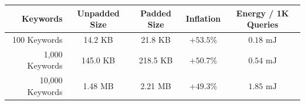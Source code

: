 \documentclass[preview,varwidth=90mm]{standalone}
\begin{document}
\begin{table}[h]
\centering
\footnotesize
\begin{tabular}{rcccc}
\toprule
\textbf{Keywords} & \textbf{Unpadded Size} & \textbf{Padded Size} & \textbf{Inflation} & \textbf{Energy / 1K Queries} \\ \midrule
100 Keywords & 14.2 KB & 21.8 KB & $+53.5\%$ & $0.18\text{ mJ}$ \\
1,000 Keywords & 145.0 KB & 218.5 KB & $+50.7\%$ & $0.54\text{ mJ}$ \\
10,000 Keywords & 1.48 MB & 2.21 MB & $+49.3\%$ & $1.85\text{ mJ}$ \\ \bottomrule
\end{tabular}
\end{table}
\end{document}
